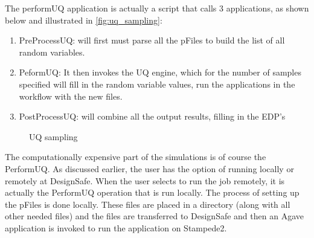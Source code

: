 The performUQ application is actually a script that calls 3
applications, as shown below and illustrated in \autoref{fig:uq_sampling}:
\begin{enumerate}
\item PreProcessUQ: will first must parse all the pFiles to build the
  list of all random variables.
\item PeformUQ: It then invokes the UQ engine, which for the number of
  samples specified will fill in the random variable values, run the
  applications in the workflow with the new files.
\item PostProcessUQ: will combine all the output results, filling in
  the EDP’s
\end{enumerate}

\begin{figure}[!htbp]
  \caption{UQ sampling}
  \label{fig:uq_sampling}
\end{figure}

The computationally expensive part of the simulations is of course the
PerformUQ. As discussed earlier, the user has the option of running
locally or remotely at DesignSafe. When the user selects to run the
job remotely, it is actually the PerformUQ operation that is run
locally. The process of setting up the pFiles is done locally. These
files are placed in a directory (along with all other needed files)
and the files are transferred to DesignSafe and then an Agave
application is invoked to run the application on Stampede2.
